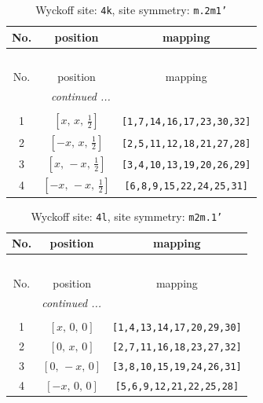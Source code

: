 \documentclass[fleqn,8pt]{jsarticle}
\begin{document}
\renewcommand{\arraystretch}{1.2}
\begin{longtable}{ccc}
\caption{Wyckoff site: {\tt 4k}, site symmetry: {\tt m.2m1'}}
 \\
 \hline \hline
No. & position & mapping \\ \hline \endfirsthead

\multicolumn{2}{l}{\tablename\ \thetable{}} \\
 \hline \hline
No. & position & mapping \\ \hline \endhead

 \hline \hline
\multicolumn{2}{r}{\footnotesize\it continued ...} \\ \endfoot

 \hline \hline
\multicolumn{2}{r}{} \\ \endlastfoot

1 & $\left[ x,\, x,\, \frac{1}{2} \right]$ & {\tt [1,7,14,16,17,23,30,32]} \\ \hline
2 & $\left[ - x,\, x,\, \frac{1}{2} \right]$ & {\tt [2,5,11,12,18,21,27,28]} \\ \hline
3 & $\left[ x,\, - x,\, \frac{1}{2} \right]$ & {\tt [3,4,10,13,19,20,26,29]} \\ \hline
4 & $\left[ - x,\, - x,\, \frac{1}{2} \right]$ & {\tt [6,8,9,15,22,24,25,31]} \\
\end{longtable}
\renewcommand{\arraystretch}{1.2}
\begin{longtable}{ccc}
\caption{Wyckoff site: {\tt 4l}, site symmetry: {\tt m2m.1'}}
 \\
 \hline \hline
No. & position & mapping \\ \hline \endfirsthead

\multicolumn{2}{l}{\tablename\ \thetable{}} \\
 \hline \hline
No. & position & mapping \\ \hline \endhead

 \hline \hline
\multicolumn{2}{r}{\footnotesize\it continued ...} \\ \endfoot

 \hline \hline
\multicolumn{2}{r}{} \\ \endlastfoot

1 & $\left[ x,\, 0,\, 0 \right]$ & {\tt [1,4,13,14,17,20,29,30]} \\ \hline
2 & $\left[ 0,\, x,\, 0 \right]$ & {\tt [2,7,11,16,18,23,27,32]} \\ \hline
3 & $\left[ 0,\, - x,\, 0 \right]$ & {\tt [3,8,10,15,19,24,26,31]} \\ \hline
4 & $\left[ - x,\, 0,\, 0 \right]$ & {\tt [5,6,9,12,21,22,25,28]} \\
\end{longtable}
\end{document}
